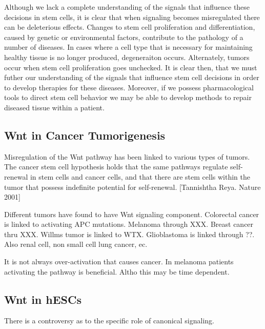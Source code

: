 Although we lack a complete understanding of the signals that influence these decisions in stem cells, it is clear that when signaling becomes misregulated there can be deleterious effects. Changes to stem cell proliferation and differentiation, caused by genetic or environmental factors, contribute to the pathology of a number of diseases. In cases where a cell type that is necessary for maintaining healthy tissue is no longer produced, degeneraiton occurs. Alternately, tumors occur when stem cell proliferation goes unchecked. It is clear then, that we must futher our understanding of the signals that influence stem cell decisions in order to develop therapies for these diseases. Moreover, if we possess pharmacological tools to direct stem cell behavior we may be able to develop methods to repair diseased tissue within a patient.


\subsection{Wnt in Cancer Tumorigenesis}

Misregulation of the Wnt pathway has been linked to various types of tumors. The cancer stem cell hypothesis holds that the same pathways regulate self-renewal in stem cells and cancer cells, and that there are stem cells within the tumor that possess indefinite potential for self-renewal. [Tannishtha Reya. Nature 2001]

Different tumors have found to have Wnt signaling component. Colorectal cancer is linked to activating APC mutations. Melanoma through XXX. Breast cancer thru XXX. Willms tumor is linked to WTX. Glioblastoma is linked through ??. Also renal cell, non small cell lung cancer, ec.

It is not always over-activation that causes cancer. In melanoma patients activating the pathway is beneficial. Altho this may be time dependent.


\subsection{Wnt in hESCs}

There is a controversy as to the specific role of canonical signaling.

